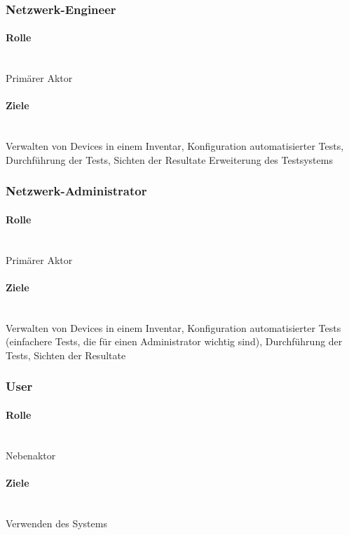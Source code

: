 \documentclass[
	ngerman,
	toc=listof, %
	toc=bibliography, %
	footnotes=multiple, %
	parskip=half, %
	numbers=noendperiod %
]{scrartcl}
\begin{document}
		\subsubsection{Netzwerk-Engineer}
		
			\paragraph{Rolle} ~\\
			Primärer Aktor 

			\paragraph{Ziele} ~\\
			Verwalten von Devices in einem Inventar, 
			Konfiguration automatisierter Tests, 
			Durchführung der Tests, 
			Sichten der Resultate
			Erweiterung des Testsystems
			\newpage

		\subsubsection{Netzwerk-Administrator}

			\paragraph{Rolle} ~\\
			Primärer Aktor 
			\paragraph{Ziele} ~\\
			Verwalten von Devices in einem Inventar, 
			Konfiguration automatisierter Tests (einfachere Tests, die für einen Administrator wichtig sind), 
			Durchführung der Tests, 
			Sichten der Resultate

		\subsubsection{User}

			\paragraph{Rolle} ~\\
			Nebenaktor 
			\paragraph{Ziele} ~\\
			Verwenden des Systems
\end{document}
